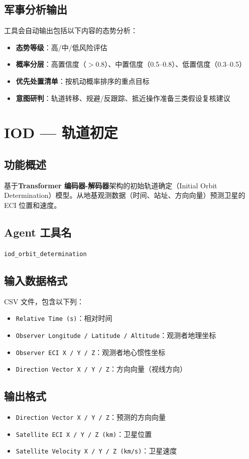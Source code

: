 \documentclass[12pt,a4paper,UTF8]{ctexart}
\begin{document}
\subsection{军事分析输出}
工具会自动输出包括以下内容的态势分析：
\begin{itemize}
    \item \textbf{态势等级}：高/中/低风险评估
    \item \textbf{概率分层}：高置信度（$>$0.8）、中置信度（0.5–0.8）、低置信度（0.3–0.5）
    \item \textbf{优先处置清单}：按机动概率排序的重点目标
    \item \textbf{意图研判}：轨道转移、规避/反跟踪、抵近操作准备三类假设复核建议
\end{itemize}

\section{IOD — 轨道初定}

\subsection{功能概述}
基于\textbf{Transformer 编码器-解码器}架构的初始轨道确定（Initial Orbit Determination）模型。从地基观测数据（时间、站址、方向向量）预测卫星的 ECI 位置和速度。

\subsection{Agent 工具名}
\texttt{iod\_orbit\_determination}

\subsection{输入数据格式}
CSV 文件，包含以下列：
\begin{itemize}
    \item \texttt{Relative Time (s)}：相对时间
    \item \texttt{Observer Longitude / Latitude / Altitude}：观测者地理坐标
    \item \texttt{Observer ECI X / Y / Z}：观测者地心惯性坐标
    \item \texttt{Direction Vector X / Y / Z}：方向向量（视线方向）
\end{itemize}

\subsection{输出格式}
\begin{itemize}
    \item \texttt{Direction Vector X / Y / Z}：预测的方向向量
    \item \texttt{Satellite ECI X / Y / Z (km)}：卫星位置
    \item \texttt{Satellite Velocity X / Y / Z (km/s)}：卫星速度
\end{itemize}
\end{document}
